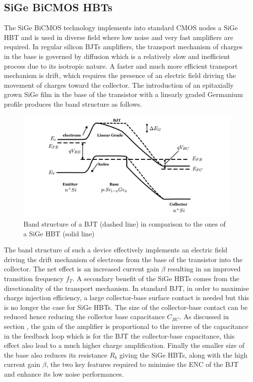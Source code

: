		
		\subsection{SiGe BiCMOS HBTs}\label{subsec:2.3.4}
		
		The SiGe BiCMOS technology implements into standard CMOS nodes a SiGe HBT and is used in diverse field where low noise and very fast amplifiers are required. In regular silicon BJTs amplifiers, the transport mechanism of charges in the base is governed by diffusion which is a relatively slow and inefficient process due to its isotropic nature. A faster and much more efficient transport mechanism is drift, which requires the presence of an electric field driving the movement of charges toward the collector. The introduction of an epitaxially grown SiGe film in the base of the transistor with a linearly graded Germanium profile produces the band structure as follows. 
		\begin{figure}[h]
		\centering
		\includegraphics[width=0.9\linewidth]{files/SiGeBand_Structure}
		\caption{Band structure of a BJT (dashed line) in comparison to the ones of a SiGe HBT (solid line) \cite{SiGEHBT_band_Structure}}
		\label{im:SiGe_bandstructure}
		\end{figure}
		
		The band structure of such a device effectively implements an electric field driving the drift mechanism of electrons from the base of the transistor into the collector. The net effect is an increased current gain $\beta$ resulting in an improved transition frequency $f_T$. A secondary benefit of the SiGe HBTs comes from the directionality of the transport mechanism. In standard BJT, in order to maximise charge injection efficiency, a large collector-base surface contact is needed but this is no longer the case for SiGe HBTs. The size of the collector-base contact can be reduced hence reducing the collector base capacitance $C_{BC}$. As discussed in section , the gain of the amplifier is proportional to the inverse of the capacitance in the feedback loop which is for the BJT the collector-base capacitance, this effect also lead to a much higher charge amplification. Finally the smaller size of the base also reduces its resistance $R_b$ giving the SiGe HBTs, along with the high current gain $\beta$, the two key features required to minimise the ENC of the BJT and enhance its low noise performances.
		
